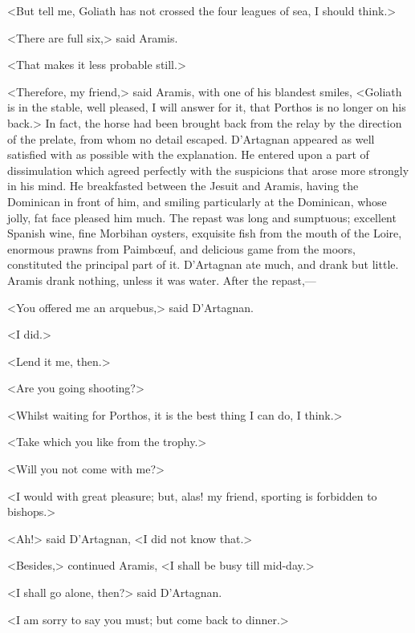 <But tell me, Goliath has not crossed the four leagues of sea, I should think.>

<There are full six,> said Aramis.

<That makes it less probable still.>

<Therefore, my friend,> said Aramis, with one of his blandest smiles, <Goliath is in the stable, well pleased, I will answer for it, that Porthos is no longer on his back.> In fact, the horse had been brought back from the relay by the direction of the prelate, from whom no detail escaped. D'Artagnan appeared as well satisfied with as possible with the explanation. He entered upon a part of dissimulation which agreed perfectly with the suspicions that arose more strongly in his mind. He breakfasted between the Jesuit and Aramis, having the Dominican in front of him, and smiling particularly at the Dominican, whose jolly, fat face pleased him much. The repast was long and sumptuous; excellent Spanish wine, fine Morbihan oysters, exquisite fish from the mouth of the Loire, enormous prawns from Paimbœuf, and delicious game from the moors, constituted the principal part of it. D'Artagnan ate much, and drank but little. Aramis drank nothing, unless it was water. After the repast,—

<You offered me an arquebus,> said D'Artagnan.

<I did.>

<Lend it me, then.>

<Are you going shooting?>

<Whilst waiting for Porthos, it is the best thing I can do, I think.>

<Take which you like from the trophy.>

<Will you not come with me?>

<I would with great pleasure; but, alas! my friend, sporting is forbidden to bishops.>

<Ah!> said D'Artagnan, <I did not know that.>

<Besides,> continued Aramis, <I shall be busy till mid-day.>

<I shall go alone, then?> said D'Artagnan.

<I am sorry to say you must; but come back to dinner.>

